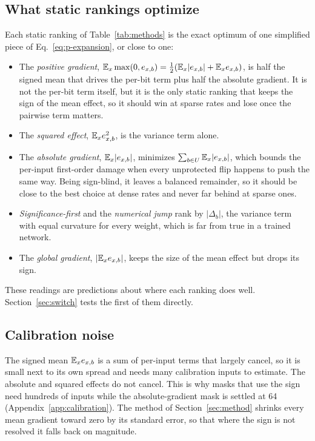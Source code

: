 \subsection{What static rankings optimize}
Each static ranking of Table~\ref{tab:methods} is the exact optimum of one simplified piece of Eq.~\eqref{eq:p-expansion}, or close to one:
\begin{itemize}
\item The \emph{positive gradient}, $\mathbb{E}_x\max(0,e_{x,b})=\tfrac12(\mathbb{E}_x|e_{x,b}|+\mathbb{E}_x e_{x,b})$, is half the signed mean that drives the per-bit term plus half the absolute gradient. It is not the per-bit term itself, but it is the only static ranking that keeps the sign of the mean effect, so it should win at sparse rates and lose once the pairwise term matters.
\item The \emph{squared effect}, $\mathbb{E}_x e_{x,b}^2$, is the variance term alone.
\item The \emph{absolute gradient}, $\mathbb{E}_x|e_{x,b}|$, minimizes $\sum_{b\in U}\mathbb{E}_x|e_{x,b}|$, which bounds the per-input first-order damage when every unprotected flip happens to push the same way. Being sign-blind, it leaves a balanced remainder, so it should be close to the best choice at dense rates and never far behind at sparse ones.
\item \emph{Significance-first} and the \emph{numerical jump} rank by $|\Delta_b|$, the variance term with equal curvature for every weight, which is far from true in a trained network.
\item The \emph{global gradient}, $|\mathbb{E}_x e_{x,b}|$, keeps the size of the mean effect but drops its sign.
\end{itemize}
These readings are predictions about where each ranking does well. Section~\ref{sec:switch} tests the first of them directly.

\subsection{Calibration noise}
The signed mean $\mathbb{E}_x e_{x,b}$ is a sum of per-input terms that largely cancel, so it is small next to its own spread and needs many calibration inputs to estimate. The absolute and squared effects do not cancel. This is why masks that use the sign need hundreds of inputs while the absolute-gradient mask is settled at 64 (Appendix~\ref{app:calibration}). The method of Section~\ref{sec:method} shrinks every mean gradient toward zero by its standard error, so that where the sign is not resolved it falls back on magnitude.

